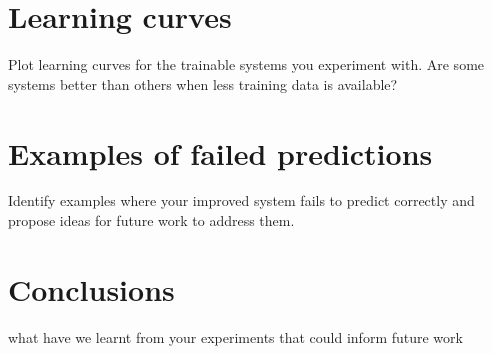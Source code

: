 \documentclass[11pt,a4paper]{article}
\begin{document}
\section{Learning curves}

Plot learning curves for the trainable systems you experiment with. Are some systems better than others when less training data is available?

\section{Examples of failed predictions}

Identify examples where your improved system fails to predict correctly and propose ideas for future work to address them.

\section{Conclusions}

what have we learnt from your experiments that could inform future work


%
%

%
%
\end{document}
